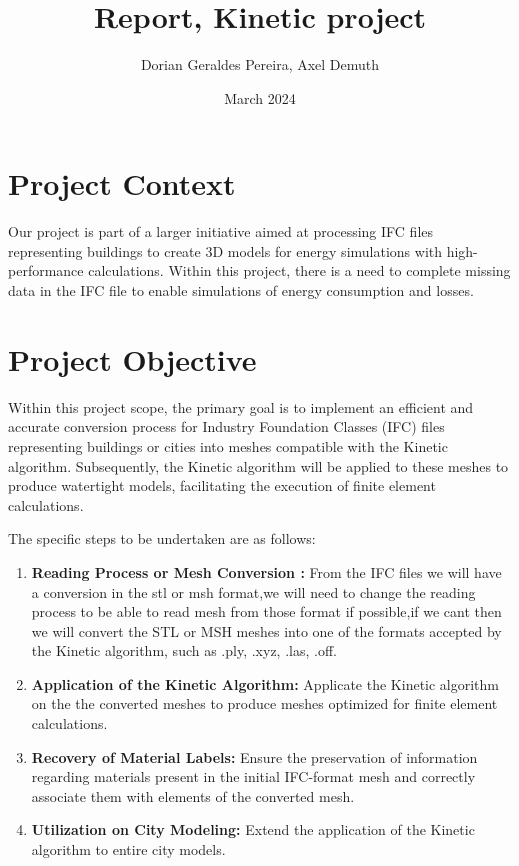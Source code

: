 \documentclass{article}
\title{Report, Kinetic project}
\author{Dorian Geraldes Pereira, Axel Demuth}
\date{March 2024}
\begin{document}
\maketitle
\tableofcontents
\newpage
\section{Project Context}

Our project is part of a larger initiative aimed at processing 
IFC files representing buildings to create 3D models for energy 
simulations with high-performance calculations. Within this project, there is a need to 
complete missing data in the IFC file to enable simulations 
of energy consumption and losses.

\section{Project Objective}

Within this project scope, the primary goal is to implement an efficient and accurate 
conversion process for Industry Foundation Classes (IFC) 
files representing buildings or cities into meshes compatible with the 
Kinetic algorithm. Subsequently, the Kinetic algorithm will be applied to these 
meshes to produce watertight models, facilitating the execution of finite element calculations.

The specific steps to be undertaken are as follows:

\begin{enumerate}   
    \item \textbf{Reading Process or Mesh Conversion :} From the IFC files we will have a 
    conversion in the stl or msh format,we will need to change the reading process to be able 
    to read mesh from those format if possible,if we cant then we will convert the STL 
    or MSH meshes into one of the formats accepted by the Kinetic algorithm, 
    such as .ply, .xyz, .las, .off.
    
    \item \textbf{Application of the Kinetic Algorithm:} Applicate  
    the Kinetic algorithm on the the converted 
    meshes to produce meshes optimized for finite element calculations.
    
    \item \textbf{Recovery of Material Labels:} Ensure the preservation 
    of information regarding materials present in the initial IFC-format mesh 
    and correctly associate them with elements of the converted mesh.
    
    \item \textbf{Utilization on City Modeling:} Extend the application of 
    the Kinetic algorithm to entire city models.
\end{enumerate}
\end{document}
